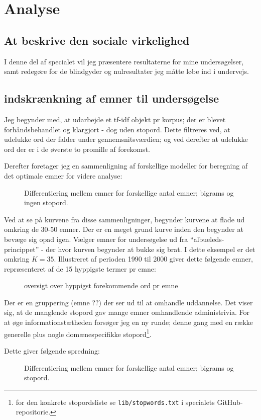 \part{Analyse}\label{part:analysis}

\chapter{At beskrive den sociale virkelighed}

I denne del af specialet vil jeg præsentere resultaterne for mine undersøgelser, samt redegøre for de blindgyder og nulresultater jeg måtte løbe ind i undervejs.

\chapter{indskrænkning af emner til undersøgelse}

Jeg begynder med, at udarbejde et tf-idf objekt pr korpus; der er blevet forhåndsbehandlet og klargjort - dog uden stopord.
Dette filtreres ved, at udelukke ord der falder under gennemsnitsværdien; og ved derefter at udelukke ord der er i de øverste to promille af forekomst.

Derefter foretager jeg en sammenligning af forskellige modeller for beregning af det optimale emner for videre analyse:

\begin{figure}[H]
\centering

\caption{Differentiering mellem emner for forskellige antal emner; bigrams og ingen stopord. }
\end{figure}

Ved at se på kurvene fra disse sammenligninger, begynder kurvene at flade ud omkring de 30-50 emner.
Der er en meget grund kurve inden den begynder at bevæge sig opad igen.
Vælger emner for undersøgelse ud fra “albueleds-princippet” - der hvor kurven begynder at bukke sig brat.
I dette eksempel er det omkring $K = 35$.
Illustreret af perioden 1990 til 2000 giver dette følgende emner, repræsenteret af de 15 hyppigste termer pr emne:

\begin{figure}[H]
\centering

\caption{oversigt over hyppigst forekommende ord pr emne}
\end{figure}


Der er en gruppering (emne ??) der ser ud til at omhandle uddannelse.
Det viser sig, at de manglende stopord gav mange emner omhandlende administrivia. For at øge informationstætheden forsøger jeg en ny runde; denne gang med en række generelle plus nogle domænespecifikke stopord\footnote{for den konkrete stopordsliste se \texttt{lib/stopwords.txt} i specialets GitHub-repositorie.}.

Dette giver følgende spredning:

\begin{figure}[H]
\centering

\caption{Differentiering mellem emner for forskellige antal emner; bigrams og stopord. }
\end{figure}


